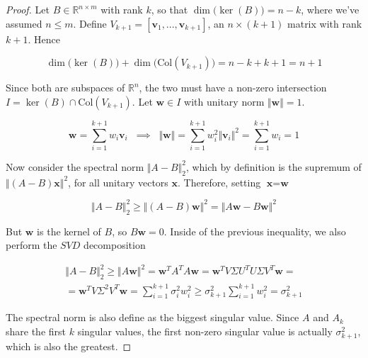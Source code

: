 \documentclass{article}
\numberwithin{equation}{subsection}
\begin{document}
\begin{proof}
    Let $B \in \mathbb{R}^{n\times m}$ with rank $k$, so that $\dim\big(\ker(B)\big) = n-k$, where we've assumed $n \leq m$. Define $V_{k+1} = [\textbf{v}_1, ..., \textbf{v}_{k+1}]$, an $n \times (k+1)$ matrix with rank $k+1$. Hence

    \begin{equation*}
        \dim\big(\ker(B)\big) + \dim\big(\text{Col}(V_{k+1})\big) = n-k+k+1 = n+1
    \end{equation*}

    Since both are subspaces of $\mathbb{R}^n$, the two must have a non-zero intersection $I = \ker(B) \cap \text{Col}(V_{k+1})$. Let $\textbf{w} \in I$ with unitary norm $\Vert \textbf{w} \Vert = 1$. 

    \begin{equation*}
        \textbf{w} = \sum_{i=1}^{k+1} w_i \textbf{v}_i \;\; \implies \;\; \Vert \textbf{w} \Vert = \sum_{i=1}^{k+1} w_i^2 \Vert \textbf{v}_i \Vert^2 = \sum_{i=1}^{k+1} w_i = 1
    \end{equation*}

    Now consider the spectral norm $\Vert A - B\Vert_2^2$, which by definition is the supremum of $\Vert (A-B)\textbf{x} \Vert^2$, for all unitary vectors $\textbf{x}$. Therefore, setting $\textbf{x} = \textbf{w}$

    \begin{equation*}
        \Vert A-B \Vert_2^2 \geq \Vert (A-B)\textbf{w} \Vert^2 = \Vert A\textbf{w} - B\textbf{w} \Vert^2
    \end{equation*}

    But $\textbf{w}$ is the kernel of $B$, so $B\textbf{w} = 0$. Inside of the previous inequality, we also perform the $SVD$ decomposition

    \begin{gather*}
        \Vert A - B \Vert_2^2 \geq \Vert A \textbf{w} \Vert^2 = \textbf{w}^T A^T A \textbf{w} = \textbf{w}^T V \Sigma U^T U \Sigma V^T \textbf{w} = \\
        = \textbf{w}^T V \Sigma^2 V^T \textbf{w} = \sum_{i=1}^{k+1} \sigma_i^2 w_i^2 \geq \sigma_{k+1}^2 \sum_{i=1}^{k+1} w_i^2 = \sigma_{k+1}^2
    \end{gather*}

    The spectral norm is also define as the biggest singular value. Since $A$ and $A_k$ share the first $k$ singular values, the first non-zero singular value is actually $\sigma_{k+1}^2$, which is also the greatest. 


\end{proof}
\end{document}
